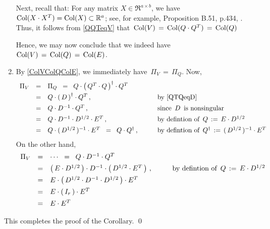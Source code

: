 \begin{enumerate}
	Next, recall that: For any matrix $X \in \Re^{a \times b}$, we have
	$\textnormal{Col}(X \cdot X^{T}) = \textnormal{Col}(X) \subset \mathbb{R}^{a}$; see, for example, Proposition B.51, p.434, \cite{Christensen2011}.
	Thus, it follows from \eqref{QQTeqV} that
	\,$\textnormal{Col}(V) \,=\, \textnormal{Col}(Q\cdot Q^{T}) \,=\, \textnormal{Col}(Q)$
	
	Hence, we may now conclude that we indeed have
	\,$\textnormal{Col}(V) \,=\, \textnormal{Col}(Q) \,=\, \textnormal{Col}(E)$.
\item
	By \eqref{ColVColQColE}, we immediately have \,$\Pi_{V} \,=\, \Pi_{Q}$.
	Now,
	\begin{equation*}
	\begin{array}{ccll}
	\Pi_{V}
	&=&
		\Pi_{Q}
		\;\; = \;\;
		Q \cdot \left(\,Q^{T} \cdot Q\,\right)^{\dagger} \cdot Q^{T}
	\\
	&\overset{{\color{white}\vert}}{=}&
		Q \cdot \left(\,D\,\right)^{\dagger} \cdot Q^{T}\,,
		&\quad\quad\textnormal{by \eqref{QTQeqD}}
	\\
	&\overset{{\color{white}\vert}}{=}&
		Q \cdot D^{-1} \cdot Q^{T}\,,
		&\quad\quad\textnormal{since \,$D$\, is nonsingular}
	\\
	&\overset{{\color{white}\vert}}{=}&
		Q \cdot D^{-1} \cdot D^{1/2} \cdot E^{T}\,,
		&\quad\quad\textnormal{by defintion of \,$Q \,:=\, E \cdot D^{1/2}$}
	\\
	&\overset{{\color{white}\vert}}{=}&
		Q \cdot (\,D^{1/2}\,)^{-1} \cdot E^{T}
		\;\; = \;\; Q \cdot Q^{\dagger}\,,
		&\quad\quad\textnormal{by defintion of \,$Q^{\dagger} \,:=\, (\,D^{1/2}\,)^{-1}\cdot E^{T}$}
	\end{array}
	\end{equation*}
	On the other hand,
	\begin{equation*}
	\begin{array}{ccll}
	\Pi_{V}
	&=&
		\cdots \;\; = \;\; Q \cdot D^{-1} \cdot Q^{T}
	\\
	&\overset{{\color{white}\vert}}{=}&
		\left(\,E \cdot D^{1/2}\,\right) \cdot D^{-1} \cdot \left(\,D^{1/2} \cdot E^{T}\,\right)\,,
		&\quad\quad\textnormal{by defintion of \,$Q \,:=\, E \cdot D^{1/2}$}
	\\
	&\overset{{\color{white}\vert}}{=}&
		E \cdot \left(\, D^{1/2} \cdot D^{-1} \cdot D^{1/2} \,\right) \cdot E^{T}
	\\
	&\overset{{\color{white}\vert}}{=}&
		E \cdot \left(\, I_{r} \,\right) \cdot E^{T}
	\\
	&\overset{{\color{white}\vert}}{=}&
		E \cdot E^{T}
	\end{array}
	\end{equation*}
\end{enumerate}
This completes the proof of the Corollary.
\qed

